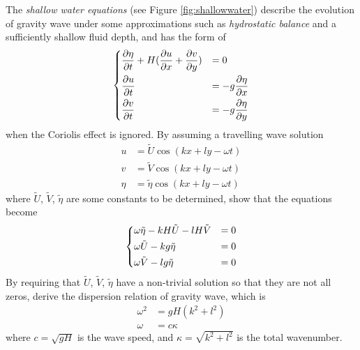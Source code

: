 \begin{Exercise}
\label{ex:shallowwater}
The \textit{shallow water equations} (see Figure \ref{fig:shallowwater}) describe the evolution of gravity wave under some approximations such as \textit{hydrostatic balance} and a sufficiently shallow fluid depth, and has the form of
\begin{align*}
\begin{dcases}
\frac{\partial \eta}{\partial t} + H(\frac{\partial u}{\partial x} + \frac{\partial v}{\partial y}) &= 0 \\
\frac{\partial u}{\partial t} &= -g\frac{\partial \eta}{\partial x} \\
\frac{\partial v}{\partial t} &= -g\frac{\partial \eta}{\partial y} 
\end{dcases}
\end{align*}
when the Coriolis effect is ignored. By assuming a travelling wave solution
\begin{align*}
u &= \tilde{U} \cos(kx + ly - \omega t) \\
v &= \tilde{V} \cos(kx + ly - \omega t) \\
\eta &= \tilde{\eta} \cos(kx + ly - \omega t)
\end{align*}
where $\tilde{U}$, $\tilde{V}$, $\tilde{\eta}$ are some constants to be determined, show that the equations become
\begin{align*}
\begin{dcases}
\omega \tilde{\eta} - kH \tilde{U} - lH \tilde{V} &= 0 \\
\omega \tilde{U} - kg \tilde{\eta} &= 0 \\
\omega \tilde{V} - lg \tilde{\eta} &= 0
\end{dcases}
\end{align*}
By requiring that $\tilde{U}$, $\tilde{V}$, $\tilde{\eta}$ have a non-trivial solution so that they are not all zeros, derive the dispersion relation of gravity wave, which is
\begin{align*}
\omega^2 &= gH(k^2 + l^2) \\
\omega &= c\kappa
\end{align*}
where $c = \sqrt{gH}$ is the wave speed, and $\kappa = \sqrt{k^2 + l^2}$ is the total wavenumber.
\end{Exercise}
